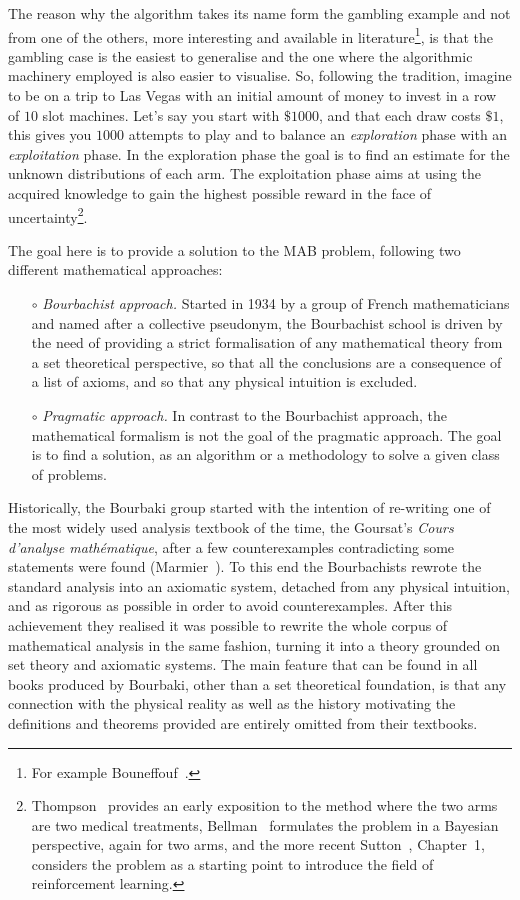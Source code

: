 \documentclass[]{scrartcl}
\theoremstyle{definition}
\begin{document}
The reason why the algorithm takes its name form the gambling example and not from one of the others, more interesting and available in literature\footnote{
    For example Bouneffouf~\cite{bf2019survey}.
    },
is that the gambling case is the easiest to generalise and the one where the algorithmic machinery employed is also easier to visualise.
So, following the tradition, imagine to be on a trip to Las Vegas with an initial amount of money to invest in a row of $10$ slot machines. Let's say you start with $\$1000$, and that each draw costs $\$1$, this gives you $1000$ attempts to play and to balance an \emph{exploration} phase with an \emph{exploitation} phase. In the exploration phase the goal is to find an estimate for the unknown distributions of each arm. The exploitation phase aims at using the acquired knowledge to gain the highest possible reward in the face of uncertainty\footnote{
    Thompson~\cite{thompson1933likelihood} provides an early exposition to the method where the two arms are two medical treatments, Bellman~\cite{bellman1956problem} formulates the problem in a Bayesian perspective, again for two arms, and the more recent Sutton~\cite{sutton2018reinforcement}, Chapter~1, considers the problem as a starting point to introduce the field of reinforcement learning.
}.

The goal here is to provide a solution to the MAB problem, following two different mathematical approaches:
\begin{itemize}
    \item[$\circ$] \emph{Bourbachist approach.} Started in 1934 by a group of French mathematicians and named after a collective pseudonym, the Bourbachist school is driven by the need of providing a strict formalisation of any mathematical theory from a set theoretical perspective, so that all the conclusions are a consequence of a list of axioms, and so that any physical intuition is excluded.
    \item[$\circ$] \emph{Pragmatic approach.} In contrast to the Bourbachist approach, the mathematical formalism is not the goal of the pragmatic approach. The goal is to find a solution, as an algorithm or a methodology to solve a given class of problems. 
\end{itemize}

Historically, the Bourbaki group started with the intention of re-writing one of the most widely used analysis textbook of the time, the Goursat’s \emph{Cours d'analyse mathématique}, after a few counterexamples contradicting some statements were found (Marmier~\cite{marmier2014idea}). To this end the Bourbachists rewrote the standard analysis into an axiomatic system, detached from any physical intuition, and as rigorous as possible in order to avoid counterexamples. After this achievement they realised it was possible to rewrite the whole corpus of mathematical analysis in the same fashion, turning it into a theory grounded on set theory and axiomatic systems. The main feature that can be found in all books produced by Bourbaki, other than a set theoretical foundation, is that any connection with the physical reality as well as the history motivating the definitions and theorems provided are entirely omitted from their textbooks.
\end{document}
